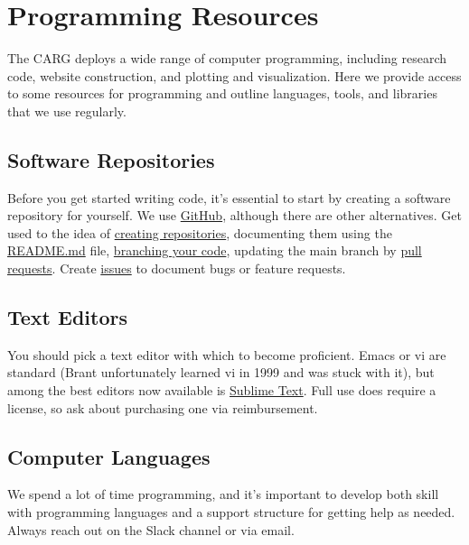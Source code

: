 \section{Programming Resources}
\label{sec:programming}

The CARG deploys a wide range of computer programming, including research code, website construction, and plotting and visualization. Here we provide access to some resources for programming and outline languages, tools, and libraries that we use regularly.

\subsection{Software Repositories}
\label{sec:github}

Before you get started writing code, it's essential to start by creating a software repository for yourself. We use
\href{https://github.com}{GitHub}, although there are other alternatives. Get used to the idea of \href{https://help.github.com/en/github/getting-started-with-github/create-a-repo}{creating repositories}, documenting them using the \href{https://help.github.com/en/github/creating-cloning-and-archiving-repositories/about-readmes}{README.md} file, \href{https://help.github.com/en/github/collaborating-with-issues-and-pull-requests/about-branches}{branching your code}, updating the main branch by \href{https://help.github.com/en/github/collaborating-with-issues-and-pull-requests/about-pull-requests}{pull requests}. Create \href{https://guides.github.com/features/issues/}{issues} to document bugs or feature requests.

\subsection{Text Editors}
\label{sec:editors}

You should pick a text editor with which to become proficient. Emacs or vi are standard (Brant unfortunately learned vi in 1999 and was stuck with it), but among the best editors now available is \href{https://www.sublimetext.com/}{Sublime Text}. Full use does require a license, so ask about purchasing one via reimbursement.

\subsection{Computer Languages}
\label{sec:languages}

We spend a lot of time programming, and it's important to develop both skill with programming languages and a support structure for getting help as needed.  Always reach out on the Slack channel or via email.

